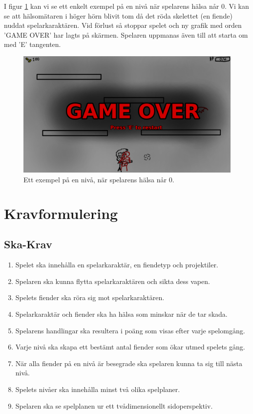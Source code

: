 \documentclass{TDP005mall}
\begin{document}
I figur \ref{fig:3} kan vi se ett enkelt exempel på en nivå när spelarens hälsa når 0. Vi kan se att hälsomätaren i höger hörn blivit tom då det röda skelettet (en fiende) nuddat spelarkaraktären. Vid förlust så stoppar spelet och ny grafik med orden 'GAME OVER' har lagts på skärmen. Spelaren uppmanas även till att starta om med 'E' tangenten.
\begin{figure}[H]
         \begin{center}
             \includegraphics[width=15cm]{Graphic/lose_concept.png}
             \caption{\label{fig:3} Ett exempel på en nivå, när spelarens hälsa når 0.}
         \end{center}
\end{figure}

\section{Kravformulering}

\subsection{Ska-Krav}

\begin{enumerate}
\item Spelet ska innehålla en spelarkaraktär, en fiendetyp och projektiler.
\item Spelaren ska kunna flytta spelarkaraktären och sikta dess vapen. 
\item Spelets fiender ska röra sig mot spelarkaraktären.
\item Spelarkaraktär och fiender ska ha hälsa som minskar när de tar skada.
\item Spelarens handlingar ska resultera i poäng som visas efter varje spelomgång.
\item Varje nivå ska skapa ett bestämt antal fiender som ökar utmed spelets gång.
\item När alla fiender på en nivå är besegrade ska spelaren kunna ta sig till nästa nivå. 
\item Spelets nivåer ska innehålla minst två olika spelplaner.
\item Spelaren ska se spelplanen ur ett tvådimensionellt sidoperspektiv.
\end{enumerate}
\end{document}
